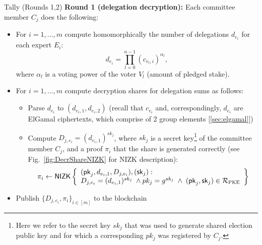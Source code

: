 \begin{boxfig}{\label{fig:tally1}Tally (Rounds 1,2)}{}
\textbf{Round 1 (delegation decryption):}
Each committee member $C_j$ does the following:
\begin{itemize}
    \item For $i = 1,\ldots, m$ compute homomorphically the number of delegations $d_{e_i}$ for each expert $E_i$:
    \[d_{e_i}=\prod_{l=0}^{n-1} (c_{v_l,i})^{\alpha_l},\]
    where $\alpha_l$ is a voting power of the voter $V_l$ (amount of pledged stake). 
    \item For $i = 1,\ldots, m$ compute decryption shares for delegation sums as follows:
    \begin{itemize}
        \item Parse $d_{e_i}$ to $(d_{e_i,1}, d_{e_i,2})$ (recall that $c_{e_i}$ and, correspondingly, $d_{e_i}$ are ElGamal ciphertexts, which comprise of 2 group elements [\ref{sec:elgamal}])
        \item Compute $D_{j,e_i}=(d_{e_i,1})^{sk_j}$, where $sk_j$ is a secret key\footnote{Here we refer to the secret key $sk_j$ that was used to generate shared election public key and for which a corresponding $pk_j$ was registered by $C_j$.} of the committee member $C_j$, and a proof $\pi_i$ that the share is generated correctly (see Fig.~\ref{fig:DecrShareNIZK} for NIZK description):
        \begin{equation*}
        \pi_i\leftarrow\mathsf{NIZK}\left\{\begin{array}{l} (\mathsf{pk}_j, d_{e_i,1}, D_{j,e_i}),(\mathsf{sk}_j): \\
         D_{j,e_i}=(d_{e_i,1})^{sk_j} \; \wedge pk_j=g^{sk_j} \; \wedge \;  (\mathsf{pk}_j,\mathsf{sk}_j)\in\mathcal{R}_{\textsc{PKE}} \end{array}\right\}
        \end{equation*}
    \end{itemize}
    \item Publish $\{D_{j,e_i}, \pi_i\}_{i \in [m]}$ to the blockchain
\end{itemize}


\end{boxfig}
